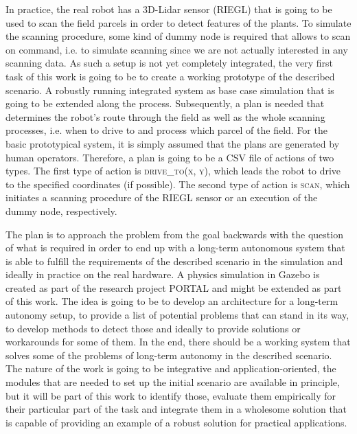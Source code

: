 \documentclass[german, master, expose, latin1]{base/thesis_KBS}
\begin{document}
In practice, the real robot has a 3D-Lidar sensor (RIEGL) that is going to be used to scan the field parcels in order to detect features of the plants.
To simulate the scanning procedure, some kind of dummy node is required that allows to scan on command, i.e. to simulate scanning since we are not actually
interested in any scanning data. As such a setup is not yet completely integrated, the very first task of this work is going to be to create a working prototype of
the described scenario. A robustly running integrated system as base case simulation that is going to be extended along the process.
Subsequently, a plan is needed that determines the robot's route through the field as well as the whole scanning processes, i.e. when to drive to and process which parcel of the field.
For the basic prototypical system, it is simply assumed that the plans are generated by human operators. Therefore, a plan is going to be a CSV file of actions of two types.
The first type of action is \textsc{drive\_to(x, y)}, which leads the robot to drive to the specified coordinates (if possible). The second type of action is \textsc{scan},
which initiates a scanning procedure of the RIEGL sensor or an execution of the dummy node, respectively.\newline

The plan is to approach the problem from the goal backwards with the question of what is required in order to end up with a long-term autonomous system that is
able to fulfill the requirements of the described scenario in the simulation and ideally in practice on the real hardware.
A physics simulation in Gazebo is created as part of the research project PORTAL and might be extended as part of this work. The idea is going to be to develop an 
architecture for a long-term autonomy setup, to provide a list of potential problems that can stand in its way, to develop methods to detect those and ideally to
provide solutions or workarounds for some of them. In the end, there should be a working system that solves some of the problems of long-term autonomy in the described scenario.
The nature of the work is going to be integrative and application-oriented, the modules that are needed to set up the initial scenario are available in principle, 
but it will be part of this work to identify those, evaluate them empirically for their particular part of the task and integrate them in a wholesome solution
that is capable of providing an example of a robust solution for practical applications.\newline
\end{document}
